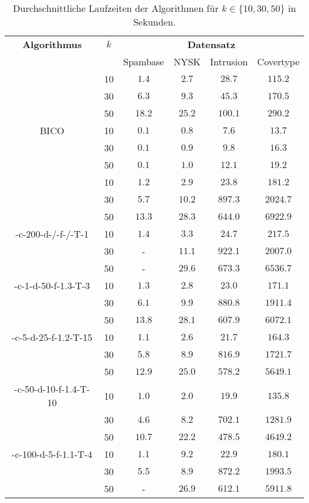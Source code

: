 \begin{table}[h]
\centering
\begin{tabular}{@{}cccccc@{}} \toprule
	\textbf{Algorithmus} & $k$ & \multicolumn{4}{c}{\textbf{Datensatz}} \\
	\cmidrule(r){3-6} & 		& Spambase 				& NYSK 				& Intrusion 			& Covertype \\ \toprule
	\Skmpp 						& 10 & $1.4$ 			& $2.7$ 			& $28.7$ 				& $115.2$ \\
		 						& 30 & $6.3$ 			& $9.3$ 			& $45.3$ 				& $170.5$ \\
		 						& 50 & $18.2$ 			& $25.2$ 			& $100.1$ 				& $290.2$ \\
	\midrule
	BICO 						& 10 & $0.1$ 			& $0.8$ 			& $7.6$ 				& $13.7$ \\
			 					& 30 & $0.1$ 			& $0.9$ 			& $9.8$ 				& $16.3$ \\
		 						& 50 & $0.1$ 			& $1.0$ 			& $12.1$ 				& $19.2$ \\
	\midrule
	\kmpp 						& 10 & $1.2$ 			& $2.9$ 			& $23.8$ 				& $181.2$ \\
			 					& 30 & $5.7$ 			& $10.2$ 			& $897.3$ 				& $2024.7$ \\
		 						& 50 & $13.3$ 			& $28.3$ 			& $644.0$ 				& $6922.9$ \\
	\midrule
	\KCsTwo-c-200-d-/-f-/-T-1	& 10 & $1.4$			& $3.3$				& $24.7$ 				& $217.5$ \\
			 					& 30 & - 				& $11.1$			& $922.1$ 				& $2007.0$ \\
		 						& 50 & - 				& $29.6$			& $673.3$ 				& $6536.7$ \\
	\midrule
	\KCsTwo-c-1-d-50-f-1.3-T-3	& 10 & $1.3$ 			& $2.8$ 			& $23.0$ 				& $171.1$ \\
			 					& 30 & $6.1$ 			& $9.9$ 			& $880.8$ 				& $1911.4$ \\
		 						& 50 & $13.8$ 			& $28.1$ 			& $607.9$ 				& $6072.1$ \\
	\midrule
	\KCsTwo-c-5-d-25-f-1.2-T-15	& 10 & $1.1$ 			& $2.6$ 			& $21.7$ 				& $164.3$ \\
			 					& 30 & $5.8$ 			& $8.9$ 			& $816.9$ 				& $1721.7$ \\
		 						& 50 & $12.9$ 			& $25.0$ 			& $578.2$ 				& $5649.1$ \\
	\midrule
	\KCsTwo-c-50-d-10-f-1.4-T-10& 10 & $1.0$ 			& $2.0$ 			& $19.9$ 				& $135.8$ \\
			 					& 30 & $4.6$ 			& $8.2$ 			& $702.1$ 				& $1281.9$ \\
		 						& 50 & $10.7$ 			& $22.2$ 			& $478.5$ 				& $4649.2$ \\
	\midrule
	\KCsTwo-c-100-d-5-f-1.1-T-4	& 10 & $1.1$ 			& $9.2$ 			& $22.9$ 				& $180.1$ \\
			 					& 30 & $5.5$ 			& $8.9$				& $872.2$ 				& $1993.5$ \\
		 						& 50 & - 				& $26.9$ 			& $612.1$ 				& $5911.8$ \\
	\bottomrule
\end{tabular}
\caption{Durchschnittliche Laufzeiten der Algorithmen für $k \in \{ 10, 30, 50 \}$ in Sekunden.}
\label{tbl:experiment-coresets-kernel-runtime}
\end{table}